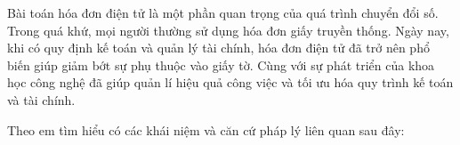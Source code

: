 Bài toán hóa đơn điện tử là một phần quan trọng của quá trình chuyển đổi số. Trong quá khứ, mọi người thường sử dụng hóa đơn giấy truyền thống. Ngày nay, khi có quy định kế toán và quản lý tài chính,    hóa đơn điện tử đã trở nên phổ biến giúp giảm bớt sự phụ thuộc vào giấy tờ. Cùng với sự phát triển của  khoa học công nghệ đã giúp quản lí hiệu quả công việc và tối ưu hóa quy trình kế toán và tài chính.

Theo em tìm hiểu có các khái niệm và căn cứ pháp lý liên quan sau đây: